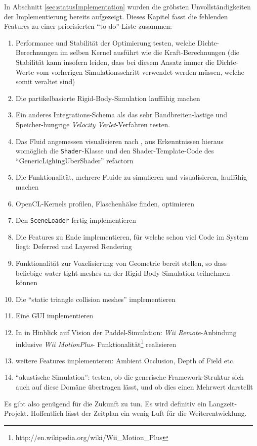   	In Abschnitt \ref{sec:statusImplementation} wurden die gröbsten Unvollständigkeiten der Implementierung
	bereits aufgezeigt. Dieses Kapitel fasst die fehlenden Features zu einer priorisierten
	"`to do"'-Liste zusammen:\\
	\begin{enumerate}
		\item Performance und Stabilität der Optimierung testen, welche Dichte-Berechnungen im selben
		Kernel ausführt wie die Kraft-Berechnungen (die Stabilität kann insofern leiden, dass bei diesem Ansatz
		immer die Dichte-Werte vom vorherigen Simulationsschritt verwendet werden müssen, welche somit veraltet sind)
		\item Die partikelbasierte Rigid-Body-Simulation lauffähig machen
		\item Ein anderes Integrations-Schema als das sehr Bandbreiten-lastige und Speicher-hungrige 
			\emph{Velocity Verlet}-Verfahren testen. 
		\item Das Fluid angemessen visualisieren nach \cite{Green2009FluidRenderingCurvatureFlow}, aus Erkenntnissen
		hieraus womöglich die \lstinline|Shader|-Klasse und den Shader-Template-Code des
		"`GenericLighingUberShader"' refactorn
		\item Die Funktionalität, mehrere Fluide zu simulieren und visualisieren, lauffähig machen
		\item OpenCL-Kernels profilen, Flaschenhälse finden, optimieren
		\item Den \lstinline|SceneLoader| fertig implementieren
		\item Die Features zu Ende implementieren, für welche schon viel Code im System liegt: 
		Deferred und Layered Rendering
		\item Funktionalität zur Voxelisierung von Geometrie bereit stellen, so dass beliebige water tight meshes
		an der Rigid Body-Simulation teilnehmen können
		\item Die "`static triangle collision meshes"' implementieren
		\item Eine GUI implementieren
		\item In in Hinblick auf Vision der Paddel-Simulation: \emph{Wii Remote}-Anbindung inklusive \emph{Wii MotionPlus}-
		Funktionalität\footnote{http://en.wikipedia.org/wiki/Wii\_Motion\_Plus} realisieren
		\item weitere Features implementeren: Ambient Occlusion, Depth of Field etc.
		\item "`akustische Simulation"': testen, ob die generische Framework-Struktur sich auch auf diese Domäne
			übertragen lässt, und ob dies einen Mehrwert darstellt
	\end{enumerate}

	Es gibt also genügend für die Zukunft zu tun. Es wird definitiv ein Langzeit-Projekt.
	Hoffentlich lässt der Zeitplan ein wenig Luft für die Weiterentwicklung.


\clearpage
